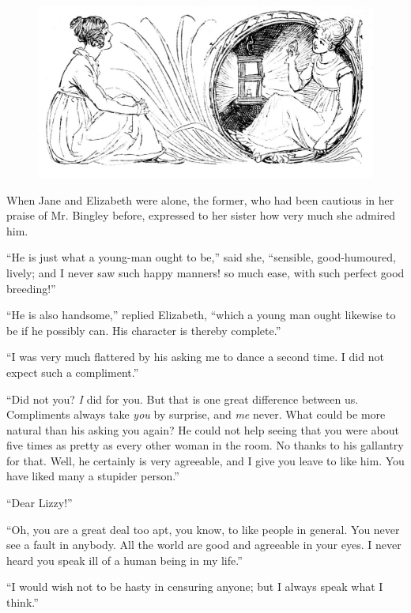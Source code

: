 \begin{figure}[htbp]
    \centering
    \includegraphics[width=\textwidth]{illustrations/i_047_a.jpg}
    \label{fig:image}
\end{figure}


When Jane and Elizabeth were alone, the former, who had been cautious in her praise of Mr. Bingley before, expressed to her sister how very much she admired him.

``He is just what a young-man ought to be,'' said she, ``sensible, good-humoured, lively; and I never saw such happy manners! so much ease, with such perfect good breeding!''

``He is also handsome,'' replied Elizabeth, ``which a young man ought likewise to be if he possibly can. His character is thereby complete.''

``I was very much flattered by his asking me to dance a second time. I did not expect such a compliment.''

``Did not you? \textit{I} did for you. But that is one great difference between us. Compliments always take \textit{you} by surprise, and \textit{me} never. What could be more natural than his asking you again? He could not help seeing that you were about five times as pretty as every other woman in the room. No thanks to his gallantry for that. Well, he certainly is very agreeable, and I give you leave to like him. You have liked many a stupider person.''

``Dear Lizzy!''

``Oh, you are a great deal too apt, you know, to like people in general. You never see a fault in anybody. All the world are good and agreeable in your eyes. I never heard you speak ill of a human being in my life.''

``I would wish not to be hasty in censuring anyone; but I always speak what I think.''

